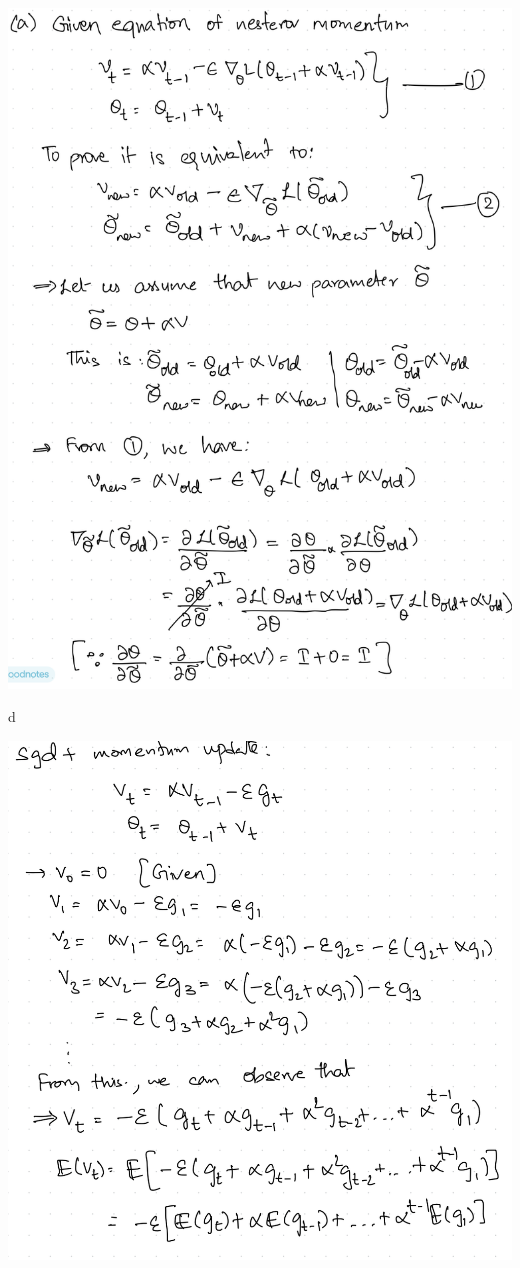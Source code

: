 \documentclass{article}
\renewcommand{\bf}[1]{\textbf{{#1}}}
\newcommand{\ul}[1]{\underline{{#1}}}
\newcommand{\tbu}{\bf{\ul{}}}
\begin{document}
\begin{minipage}{2.6in}
\includegraphics[scale=0.22]{mr51.png}

\tbu{d}

\includegraphics[scale=0.22]{mr5d.png}

\end{minipage}
\end{document}
